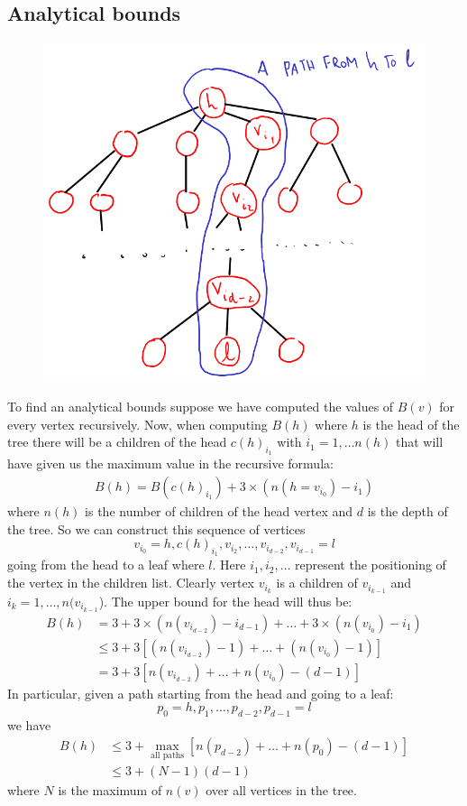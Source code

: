 \documentclass{article}
\begin{document}
\subsection{Analytical bounds}
\begin{figure}[H]
    \includegraphics[width=\textwidth]{pics/path.png}
\end{figure}
To find an analytical bounds suppose we have computed the values of $B(v)$ for every vertex recursively. Now, when computing $B(h)$ where $h$ is the head of the tree there will be a children of the head $c(h)_{i_1}$ with $i_1=1, \dots n(h)$ that will have given us the maximum value in the recursive formula:
\begin{align}
    B(h) = B(c(h)_{i_1}) + 3\times(n(h=v_{i_0})-i_1)
\end{align}
where $n(h)$ is the number of children of the head vertex and $d$ is the depth of the tree. So we can construct this sequence of vertices $$v_{i_0} = h, c(h)_{i_1}, v_{i_2}, \dots, v_{i_{d-2}},v_{i_{d-1}}=l$$ going from the head to a leaf where $l$. Here $i_1, i_2, \dots$ represent the positioning of the vertex in the children list. Clearly vertex $v_{i_k}$ is a children of $v_{i_{k-1}}$ and $i_k = 1, \dots, n(v_{i_{k-1}}$).
The upper bound for the head will thus be:
\begin{align*}
    B(h) &= 3 + 3\times(n(v_{i_{d-2}})-i_{d-1})+\dots+3\times(n(v_{i_0})-i_1)\\
    &\leq 3+3\left[(n(v_{i_{d-2}})-1)+\dots+(n(v_{i_{0}})-1)\right]\\
    &= 3+3\left[n(v_{i_{d-2}})+\dots+n(v_{i_{0}})-(d-1)\right]
\end{align*}
In particular, given a path starting from the head and going to a leaf:
$$p_0 = h, p_1, \dots, p_{d-2}, p_{d-1} = l$$ we have
\begin{align}
    B(h) &\leq 3+\max_{\text{all paths}}[n(p_{d-2})+\dots+n(p_{0})-(d-1)]\\
    &\leq 3 + (N-1)(d-1)
\end{align}
where $N$ is the maximum of $n(v)$ over all vertices in the tree.
\end{document}
